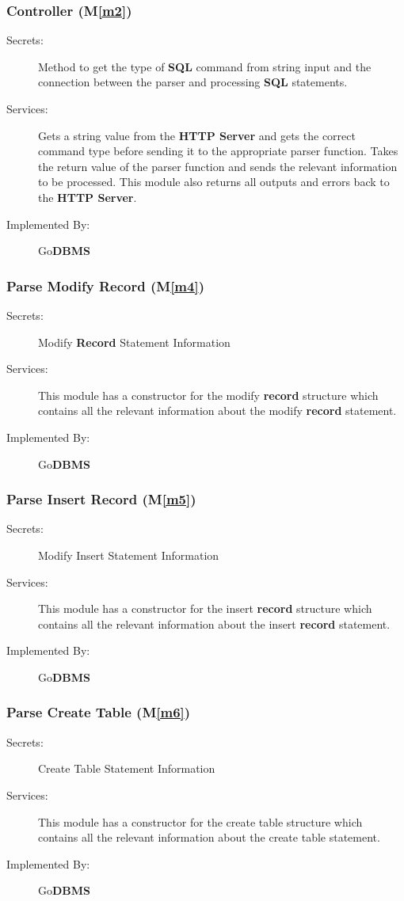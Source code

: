 \documentclass[12pt, titlepage]{article}
\newcommand{\mref}[1]{M\ref{#1}}
\begin{document}
\subsubsection{Controller (\mref{m2})}
\begin{description}
\item[Secrets:]Method to get the type of \textbf{SQL} command from string input and the connection between the parser and processing \textbf{SQL} statements.
\item[Services:]Gets a string value from the \textbf{HTTP Server} and gets the correct command type before sending it to the appropriate parser function. Takes the return value of the parser function and sends the relevant information to be processed. This module also returns all outputs and errors back to the \textbf{HTTP Server}.
\item[Implemented By:] Go\textbf{DBMS}
\end{description}

\subsubsection{Parse Modify \textbf{Record} (\mref{m4})}
\begin{description}
\item[Secrets:]Modify \textbf{Record} Statement Information
\item[Services:]This module has a constructor for the modify \textbf{record} structure which contains all the relevant information about the modify \textbf{record} statement.
\item[Implemented By:] Go\textbf{DBMS}
\end{description}

\subsubsection{Parse Insert \textbf{Record} (\mref{m5})}
\begin{description}
\item[Secrets:]Modify Insert Statement Information
\item[Services:]This module has a constructor for the insert \textbf{record} structure which contains all the relevant information about the insert \textbf{record} statement.
\item[Implemented By:] Go\textbf{DBMS}
\end{description}

\subsubsection{Parse Create Table (\mref{m6})}
\begin{description}
\item[Secrets:]Create Table Statement Information
\item[Services:]This module has a constructor for the create table structure which contains all the relevant information about the create table statement.
\item[Implemented By:] Go\textbf{DBMS}
\end{description}
\end{document}
